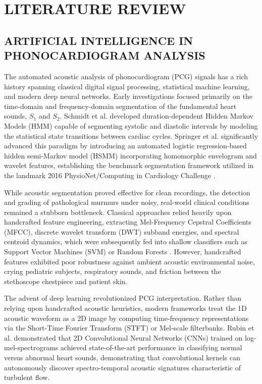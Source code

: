 \documentclass[12pt,a4paper]{amritareport}
\begin{document}
\chapter{LITERATURE REVIEW}

\section{ARTIFICIAL INTELLIGENCE IN PHONOCARDIOGRAM ANALYSIS}

The automated acoustic analysis of phonocardiogram (PCG) signals has a rich history spanning classical digital signal processing, statistical machine learning, and modern deep neural networks. Early investigations focused primarily on the time-domain and frequency-domain segmentation of the fundamental heart sounds, $S_1$ and $S_2$. Schmidt et al. \cite{schmidt2010segmentation} developed duration-dependent Hidden Markov Models (HMM) capable of segmenting systolic and diastolic intervals by modeling the statistical state transitions between cardiac cycles. Springer et al. \cite{springer2015autoregressive} significantly advanced this paradigm by introducing an automated logistic regression-based hidden semi-Markov model (HSMM) incorporating homomorphic envelogram and wavelet features, establishing the benchmark segmentation framework utilized in the landmark 2016 PhysioNet/Computing in Cardiology Challenge \cite{clifford2016recent}.

While acoustic segmentation proved effective for clean recordings, the detection and grading of pathological murmurs under noisy, real-world clinical conditions remained a stubborn bottleneck. Classical approaches relied heavily upon handcrafted feature engineering, extracting Mel-Frequency Cepstral Coefficients (MFCC), discrete wavelet transform (DWT) subband energies, and spectral centroid dynamics, which were subsequently fed into shallow classifiers such as Support Vector Machines (SVM) or Random Forests \cite{leng2015phonocardiogram}. However, handcrafted features exhibited poor robustness against ambient acoustic environmental noise, crying pediatric subjects, respiratory sounds, and friction between the stethoscope chestpiece and patient skin.

The advent of deep learning revolutionized PCG interpretation. Rather than relying upon handcrafted acoustic heuristics, modern frameworks treat the 1D acoustic waveform as a 2D image by computing time-frequency representations via the Short-Time Fourier Transform (STFT) or Mel-scale filterbanks. Rubin et al. \cite{rubin2017recognizing} demonstrated that 2D Convolutional Neural Networks (CNNs) trained on log-mel-spectrograms achieved state-of-the-art performance in classifying normal versus abnormal heart sounds, demonstrating that convolutional kernels can autonomously discover spectro-temporal acoustic signatures characteristic of turbulent flow. 
\end{document}
